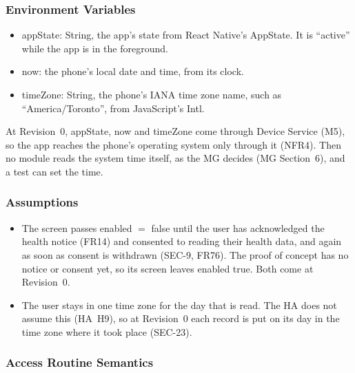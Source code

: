 \documentclass[12pt, titlepage]{article}
\begin{document}
\subsubsection{Environment Variables}

\begin{itemize}
\item appState: String, the app's state from React Native's AppState. It is
  ``active'' while the app is in the foreground.
\item now: the phone's local date and time, from its clock.
\item timeZone: String, the phone's IANA time zone name, such as
  ``America/Toronto'', from JavaScript's Intl.
\end{itemize}

\noindent At Revision~0, appState, now and timeZone come through Device
Service (M5), so the app reaches the phone's operating system only through it
(NFR4). Then no module reads the system time itself, as the MG decides (MG
Section~6), and a test can set the time.

\subsubsection{Assumptions}

\begin{itemize}
\item The screen passes enabled $=$ false until the user has acknowledged the
  health notice (FR14) and consented to reading their health data, and again
  as soon as consent is withdrawn (SEC-9, FR76). The proof of concept has no
  notice or consent yet, so its screen leaves enabled true. Both come at
  Revision~0.
\item The user stays in one time zone for the day that is read. The HA does
  not assume this (HA~H9), so at Revision~0 each record is put on its day in
  the time zone where it took place (SEC-23).
\end{itemize}

\subsubsection{Access Routine Semantics}
\end{document}
